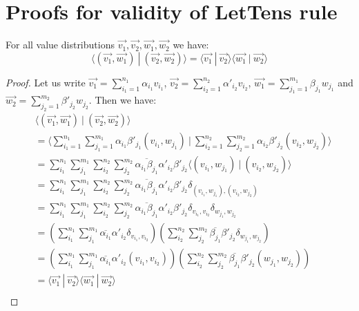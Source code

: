 \documentclass[runningheads,orivec]{llncs}
\def\scal#1#2{\langle{#1}~|~{#2}\rangle}
\def\Pair#1#2{(#1,#2)} %
\def\Kron#1#2{\ensuremath{\delta_{#1,#2}}}
\begin{document}
\section{Proofs for validity of LetTens rule}
\begin{proposition}\label{prop:InnerProdPairs} For all value distributions $\vec{v_1}, \vec{v_2}, \vec{w_1}, \vec{w_2}$ we have:
\[
\scal{\Pair{\vec{v_1}}{\vec{w_1}}}{\Pair{\vec{v_2}}{\vec{w_2}}} = \scal{\vec{v_1}}{\vec{v_2}}\scal{\vec{w_1}}{\vec{w_2}}
\]
\begin{proof}
    Let us write $\vec{v_1}=\sum_{i_1=1}^{n_1}\alpha_{i_1} v_{i_1}$, $\vec{v_2}=\sum_{i_2=1}^{n_2}\alpha'_{i_2} v_{i_2}$, $\vec{w_1}=\sum_{j_1=1}^{m_1}\beta_{j_1} w_{j_1}$ and $\vec{w_2}=\sum_{j_2=1}^{m_2}\beta'_{j_2} w_{j_2}$. Then we have:
    \begin{align*}
        &\scal{\Pair{\vec{v_1}}{\vec{w_1}}}{\Pair{\vec{v_2}}{\vec{w_2}}}\\
        &=\scal{\sum_{i_1=1}^{n_1}\sum_{j_1=1}^{m_1} \alpha_{i_1}\beta'_{j_1}\Pair{v_{i_1}}{w_{j_1}}}{\sum_{i_2=1}^{n_2}\sum_{j_2=1}^{m_2} \alpha_{i_2}\beta'_{j_2}\Pair{v_{i_2}}{w_{j_2}}}\\
        &=\sum_{i_1}^{n_1}\sum_{j_1}^{m_1}\sum_{i_2}^{n_2}\sum_{j_2}^{m_2} \overline{\alpha_{i_1}\beta_{j_1}} \alpha'_{i_2}\beta'_{j_2} \scal{\Pair{v_{i_1}}{w_{j_1}}}{\Pair{v_{i_2}}{w_{j_2}}}\\
        &=\sum_{i_1}^{n_1}\sum_{j_1}^{m_1}\sum_{i_2}^{n_2}\sum_{j_2}^{m_2} \overline{\alpha_{i_1}\beta_{j_1}} \alpha'_{i_2}\beta'_{j_2} \Kron{\Pair{v_{i_1}}{w_{j_1}}}{\Pair{v_{i_2}}{w_{j_2}}}\\
        &=\sum_{i_1}^{n_1}\sum_{j_1}^{m_1}\sum_{i_2}^{n_2}\sum_{j_2}^{m_2} \overline{\alpha_{i_1}\beta_{j_1}} \alpha'_{i_2}\beta'_{j_2} \Kron{v_{i_1}}{v_{i_2}}\Kron{w_{j_1}}{w_{j_2}}\\
        &=(\sum_{i_1}^{n_1}\sum_{j_1}^{m_1}\overline{\alpha_{i_1}}\alpha'_{i_2}\Kron{v_{i_1}}{v_{i_2}})(\sum_{i_2}^{n_2}\sum_{j_2}^{m_2} \overline{\beta_{j_1}} \beta'_{j_2} \Kron{w_{j_1}}{w_{j_2}})\\
        &=(\sum_{i_1}^{n_1}\sum_{j_1}^{m_1}\overline{\alpha_{i_1}}\alpha'_{i_2}\Pair{v_{i_1}}{v_{i_2}})(\sum_{i_2}^{n_2}\sum_{j_2}^{m_2} \overline{\beta_{j_1}} \beta'_{j_2} \Pair{w_{j_1}}{w_{j_2}})\\
        &=\scal{\vec{v_1}}{\vec{v_2}}\scal{\vec{w_1}}{\vec{w_2}}\\
    \end{align*}
\end{proof}  

\end{proposition}
\end{document}

